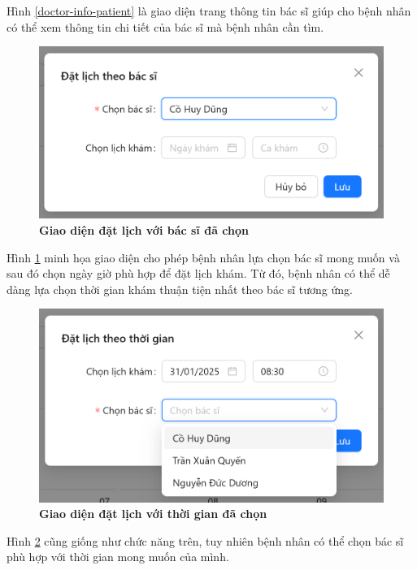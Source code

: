 Hình \ref{doctor-info-patient} là giao diện trang thông tin bác sĩ giúp cho bệnh nhân có thể xem thông tin chi tiết của bác sĩ mà bệnh nhân cần tìm.

\begin{figure}[H]
	\centering
	\includegraphics[width=12cm]{Images/patient_ui/schedule-with-doctor.png}
	\caption[Giao diện đặt lịch với bác sĩ đã chọn]{\bfseries \fontsize{12pt}{0pt}\selectfont Giao diện đặt lịch với bác sĩ đã chọn}
	\label{schedule-with-doctor}
\end{figure}

Hình \ref{schedule-with-doctor} minh họa giao diện cho phép bệnh nhân lựa chọn bác sĩ mong muốn và sau đó chọn ngày giờ phù hợp để đặt lịch khám.
Từ đó, bệnh nhân có thể dễ dàng lựa chọn thời gian khám thuận tiện nhất theo bác sĩ tương ứng.

\begin{figure}[H]
	\centering
	\includegraphics[width=12cm]{Images/patient_ui/schedule-with-time.png}
	\caption[Giao diện đặt lịch với thời gian đã chọn]{\bfseries \fontsize{12pt}{0pt}\selectfont Giao diện đặt lịch với thời gian đã chọn}
	\label{schedule-with-time}
\end{figure}

Hình \ref{schedule-with-time} cũng giống như chức năng trên, tuy nhiên bệnh nhân có thể chọn bác sĩ phù hợp với thời gian mong muốn của mình.

